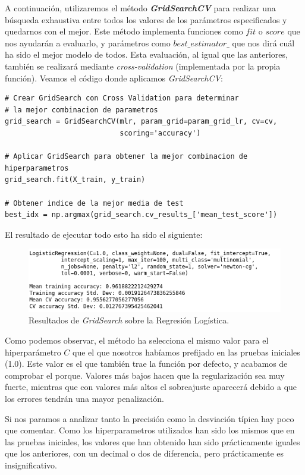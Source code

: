 \documentclass[11pt,a4paper]{article}
\begin{document}
A continuación, utilizaremos el método \textbf{\textit{GridSearchCV}}\cite{GridSearchCV} para realizar una búsqueda exhaustiva entre todos los valores de los parámetros especificados y quedarnos con el mejor. Este método implementa funciones como $fit$ o $score$ que nos ayudarán a evaluarlo, y parámetros como $best\_estimator\_$ que nos dirá cuál ha sido el mejor modelo de todos. Esta evaluación, al igual que las anteriores, también se realizará mediante \textit{cross-validation} (implementada por la propia función). Veamos el código donde aplicamos \textit{GridSearchCV}:

\begin{lstlisting}
# Crear GridSearch con Cross Validation para determinar
# la mejor combinacion de parametros
grid_search = GridSearchCV(mlr, param_grid=param_grid_lr, cv=cv,
                           scoring='accuracy')

# Aplicar GridSearch para obtener la mejor combinacion de hiperparametros
grid_search.fit(X_train, y_train)

# Obtener indice de la mejor media de test
best_idx = np.argmax(grid_search.cv_results_['mean_test_score'])

\end{lstlisting}

El resultado de ejecutar todo esto ha sido el siguiente:

\begin{figure}[H]
    \centering
    \includegraphics[scale=0.6]{img/gs-lr.png}
    \caption{Resultados de \textit{GridSearch} sobre la Regresión Logística.}
    \label{fig:gs-lr}
\end{figure}

Como podemos observar, el método ha selecciona el mismo valor para el hiperparámetro $C$ que el que nosotros habíamos prefijado en las pruebas iniciales (1.0). Este valor es el que también trae la función por defecto, y acabamos de comprobar el porque. Valores más bajos hacen que la regularización sea muy fuerte, mientras que con valores más altos el sobreajuste aparecerá debido a que los errores tendrán una mayor penalización.

Si nos paramos a analizar tanto la precisión como la desviación típica hay poco que comentar. Como los hiperparametros utilizados han sido los mismos que en las pruebas iniciales, los valores que han obtenido han sido prácticamente iguales que los anteriores, con un decimal o dos de diferencia, pero prácticamente es insignificativo.
\end{document}
